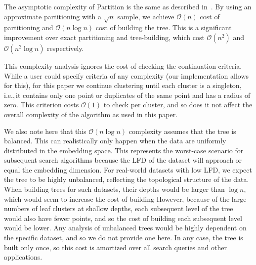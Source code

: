 The asymptotic complexity of Partition is the same as described in~\cite{ishaq2019clustered}.
By using an approximate partitioning with a $\sqrt{n}$ sample, we achieve $\mathcal{O}(n)$ cost of partitioning and $\mathcal{O}(n \log n)$ cost of building the tree.
This is a significant improvement over exact partitioning and tree-building, which cost $\mathcal{O}(n^2)$ and $\mathcal{O}(n^2 \log n)$ respectively.

This complexity analysis ignores the cost of checking the continuation criteria.
While a user could specify criteria of any complexity (our implementation allows for this), for this paper we continue clustering until each cluster is a singleton, i.e.,\,it contains only one point or duplicates of the same point and has a radius of zero.
This criterion costs $\mathcal{O}(1)$ to check per cluster, and so does it not affect the overall complexity of the algorithm as used in this paper.

We also note here that this $\mathcal{O}(n \log n)$ complexity assumes that the tree is balanced.
This can realistically only happen when the data are uniformly distributed in the embedding space.
This represents the worst-case scenario for subsequent search algorithms because the LFD of the dataset will approach or equal the embedding dimension.
For real-world datasets with low LFD, we expect the tree to be highly unbalanced, reflecting the topological structure of the data.
When building trees for such datasets, their depths would be larger than $\log n$, which would seem to increase the cost of building
However, because of the large numbers of leaf clusters at shallow depths, each subsequent level of the tree would also have fewer points, and so the cost of building each subsequent level would be lower.
Any analysis of unbalanced trees would be highly dependent on the specific dataset, and so we do not provide one here.
In any case, the tree is built only once, so this cost is amortized over all search queries and other applications.



